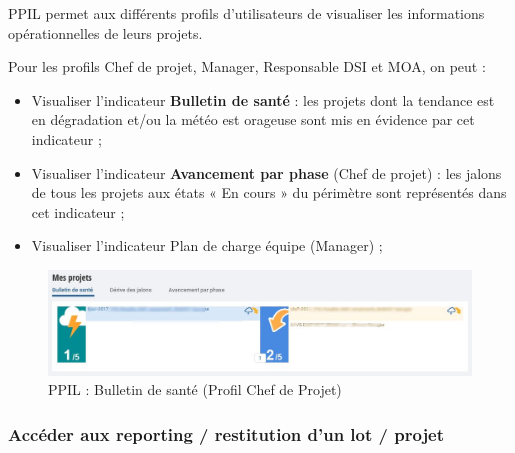 PPIL permet aux différents profils d'utilisateurs de visualiser les informations opérationnelles de leurs projets.

Pour les profils Chef de projet, Manager, Responsable DSI et MOA, on peut :
\begin{itemize}
    \item Visualiser l’indicateur \textbf{Bulletin de santé} : les projets dont la tendance est en dégradation et/ou la météo est orageuse sont mis en évidence par cet indicateur ;
    \item Visualiser l’indicateur \textbf{Avancement par phase} (Chef de projet) : les jalons de tous les projets aux états « En cours » du périmètre sont représentés dans cet indicateur ;
    \item Visualiser l’indicateur Plan de charge équipe (Manager) ;
\end{itemize}

\begin{figure}[h]
\centering
\includegraphics[width=1\textwidth]{images/ppil-bulletion-de-sante-censored.png}
\caption{PPIL : Bulletin de santé (Profil Chef de Projet)}
\end{figure}

\subsubsection{Accéder aux reporting / restitution d'un lot / projet}

